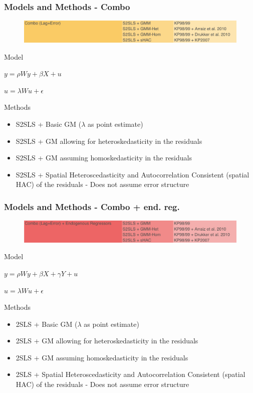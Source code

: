 \documentclass[nototal]{beamer}
\begin{document}
\begin{frame}
	\frametitle{Models and Methods - Combo}
  \begin{figure}
  \includegraphics[width=1\linewidth]{figs/models_combo.png}
  \end{figure}
 
\begin{block}{Model}
  \begin{center}
  $y = \rho W y + \beta X + u$
 
  $u = \lambda W u + \epsilon$
  \end{center}
 \end{block} 
\begin{block}{Methods}
 \begin{itemize}
 \item  S2SLS + Basic GM ($\lambda$ as point estimate)
 \item  S2SLS + GM allowing for heteroskedasticity in the residuals
 \item  S2SLS + GM assuming homoskedasticity in the residuals
 \item  S2SLS + Spatial Heteroscedasticity and Autocorrelation Consistent (spatial HAC) of the residuals - Does not assume error structure
 \end{itemize}
 \end{block} \end{frame} 

\begin{frame}
	\frametitle{Models and Methods - Combo + end. reg.}
  \begin{figure}
  \includegraphics[width=1\linewidth]{figs/models_combo_end.png}
  \end{figure}
 
\begin{block}{Model}
  \begin{center}
  $y = \rho W y + \beta X + \gamma Y + u$
 
  $u = \lambda W u + \epsilon$
  \end{center}
 \end{block} 
\begin{block}{Methods}
 \begin{itemize}
 \item  2SLS + Basic GM ($\lambda$ as point estimate)
 \item  2SLS + GM allowing for heteroskedasticity in the residuals
 \item  2SLS + GM assuming homoskedasticity in the residuals
 \item  2SLS + Spatial Heteroscedasticity and Autocorrelation Consistent (spatial HAC) of the residuals - Does not assume error structure
 \end{itemize}
 \end{block} \end{frame} 
\end{document}
